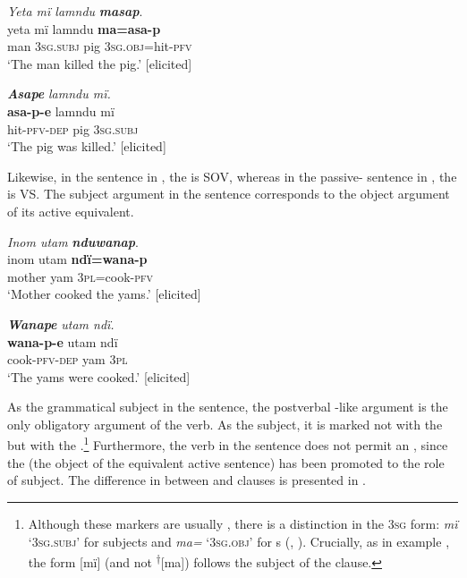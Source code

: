 \ea%
    \label{ex:syntax:272}
          \textit{Yeta mï lamndu} \textbf{\textit{masap}}.\\
\gll yeta  mï      lamndu  \textbf{ma=asa-p}\\
    man  3\textsc{sg.subj}  pig      3\textsc{sg.obj=}hit-\textsc{pfv}\\
\glt `The man killed the pig.’ [elicited]
\z

\ea%
    \label{ex:syntax:273}
          \textbf{\textit{Asape}} \textit{lamndu mï.}\\
\gll    \textbf{asa-p-e}    lamndu  mï\\
    hit-\textsc{pfv-dep}  pig      3\textsc{sg.subj}\\
\glt `The pig was killed.’ [elicited]
\z

Likewise, in the  sentence in , the  is SOV, whereas in the passive- sentence in , the  is VS. The subject argument in the  sentence corresponds to the object argument of its  active equivalent.

\ea%
    \label{ex:syntax:274}
          \textit{Inom utam} \textbf{\textit{nduwanap}}.\\
\gll inom  utam  \textbf{ndï=wana-p}\\
    mother  yam  3\textsc{pl=}cook-\textsc{pfv}\\
\glt `Mother cooked the yams.’ [elicited]
\z

\ea%
    \label{ex:syntax:275}
          \textbf{\textit{Wanape}} \textit{utam ndï.}\\
\gll    \textbf{wana-p-e}    utam  ndï\\
    cook-\textsc{pfv-dep}  yam  3\textsc{pl}\\
\glt `The yams were cooked.’ [elicited]
\z

As the grammatical subject in the  sentence, the postverbal -like argument is the only obligatory argument of the verb. As the subject, it is marked not with the  but with the .\footnote{Although these markers are usually , there is a distinction in the 3\textsc{sg} form: \textit{mï} ‘3\textsc{sg.subj’} for subjects and \textit{ma=} ‘3\textsc{sg.obj’} for s (, ). Crucially, as in example , the form [mï] (and not \textsuperscript{†}[ma]) follows the subject of the  clause.} Furthermore, the verb in the  sentence does not permit an  , since the   (the object of the equivalent  active sentence) has been promoted to the role of subject. The difference in  between  and  clauses is presented in .

